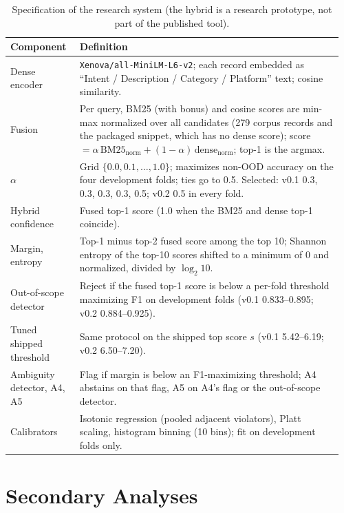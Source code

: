 \begin{table}[t]
  \centering
  \small
  \setlength{\tabcolsep}{4pt}
  \begin{tabular}{@{}p{0.2\linewidth}p{0.76\linewidth}@{}}
    \toprule
    \textbf{Component} & \textbf{Definition} \\
    \midrule
    Dense encoder & \texttt{Xenova/all-MiniLM-L6-v2}; each record embedded as ``Intent / Description / Category / Platform'' text; cosine similarity. \\
    Fusion & Per query, BM25 (with bonus) and cosine scores are min-max normalized over all candidates (279 corpus records and the packaged snippet, which has no dense score); score $=\alpha\,\mathrm{BM25}_{\mathrm{norm}}+(1-\alpha)\,\mathrm{dense}_{\mathrm{norm}}$; top-1 is the argmax. \\
    $\alpha$ & Grid $\{0.0,0.1,\dots,1.0\}$; maximizes non-OOD accuracy on the four development folds; ties go to 0.5. Selected: v0.1 0.3, 0.3, 0.3, 0.3, 0.5; v0.2 0.5 in every fold. \\
    Hybrid confidence & Fused top-1 score (1.0 when the BM25 and dense top-1 coincide). \\
    Margin, entropy & Top-1 minus top-2 fused score among the top 10; Shannon entropy of the top-10 scores shifted to a minimum of 0 and normalized, divided by $\log_2 10$. \\
    Out-of-scope detector & Reject if the fused top-1 score is below a per-fold threshold maximizing F1 on development folds (v0.1 0.833--0.895; v0.2 0.884--0.925). \\
    Tuned shipped threshold & Same protocol on the shipped top score $s$ (v0.1 5.42--6.19; v0.2 6.50--7.20). \\
    Ambiguity detector, A4, A5 & Flag if margin is below an F1-maximizing threshold; A4 abstains on that flag, A5 on A4's flag or the out-of-scope detector. \\
    Calibrators & Isotonic regression (pooled adjacent violators), Platt scaling, histogram binning (10 bins); fit on development folds only. \\
    \bottomrule
  \end{tabular}
  \caption{Specification of the research system (the hybrid is a research prototype, not part of the published tool).}
  \label{tab:spec}
\end{table}

\section{Secondary Analyses}
\label{app:secondary}

